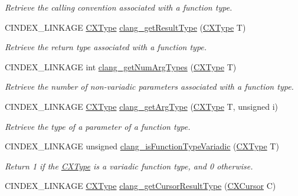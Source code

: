 \begin{DoxyCompactItemize}
\begin{DoxyCompactList}\small\item\em Retrieve the calling convention associated with a function type. \end{DoxyCompactList}\item 
C\+I\+N\+D\+E\+X\+\_\+\+L\+I\+N\+K\+A\+GE \hyperlink{structCXType}{C\+X\+Type} \hyperlink{group__CINDEX__TYPES_ga39b4850746f39e17c6b8b4eef3154d85}{clang\+\_\+get\+Result\+Type} (\hyperlink{structCXType}{C\+X\+Type} T)
\begin{DoxyCompactList}\small\item\em Retrieve the return type associated with a function type. \end{DoxyCompactList}\item 
C\+I\+N\+D\+E\+X\+\_\+\+L\+I\+N\+K\+A\+GE int \hyperlink{group__CINDEX__TYPES_ga705e1a4ed7c7595606fc30ed5d2a6b5a}{clang\+\_\+get\+Num\+Arg\+Types} (\hyperlink{structCXType}{C\+X\+Type} T)
\begin{DoxyCompactList}\small\item\em Retrieve the number of non-\/variadic parameters associated with a function type. \end{DoxyCompactList}\item 
C\+I\+N\+D\+E\+X\+\_\+\+L\+I\+N\+K\+A\+GE \hyperlink{structCXType}{C\+X\+Type} \hyperlink{group__CINDEX__TYPES_ga67f60ba4831b1bfd90ab0c1c12adab27}{clang\+\_\+get\+Arg\+Type} (\hyperlink{structCXType}{C\+X\+Type} T, unsigned i)
\begin{DoxyCompactList}\small\item\em Retrieve the type of a parameter of a function type. \end{DoxyCompactList}\item 
\mbox{\label{group__CINDEX__TYPES_ga343b2463b0ed4b259739242cf26c3ae2}} 
C\+I\+N\+D\+E\+X\+\_\+\+L\+I\+N\+K\+A\+GE unsigned \hyperlink{group__CINDEX__TYPES_ga343b2463b0ed4b259739242cf26c3ae2}{clang\+\_\+is\+Function\+Type\+Variadic} (\hyperlink{structCXType}{C\+X\+Type} T)
\begin{DoxyCompactList}\small\item\em Return 1 if the \hyperlink{structCXType}{C\+X\+Type} is a variadic function type, and 0 otherwise. \end{DoxyCompactList}\item 
C\+I\+N\+D\+E\+X\+\_\+\+L\+I\+N\+K\+A\+GE \hyperlink{structCXType}{C\+X\+Type} \hyperlink{group__CINDEX__TYPES_ga6995a2d6352e7136868574b299005a63}{clang\+\_\+get\+Cursor\+Result\+Type} (\hyperlink{structCXCursor}{C\+X\+Cursor} C)

\end{DoxyCompactItemize}
